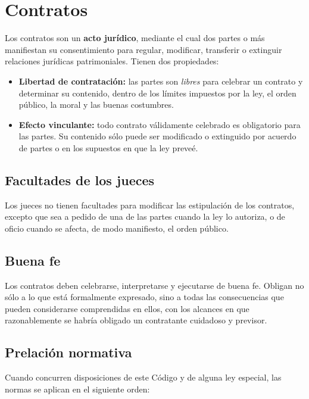 \documentclass[../resumen.tex]{subfiles}
\begin{document}
\section{Contratos}

Los contratos son un \textbf{acto jurídico}, mediante el cual dos partes o más
manifiestan su consentimiento para regular, modificar, transferir o extinguir
relaciones jurídicas patrimoniales. Tienen dos propiedades:

\begin{itemize}
  \item \textbf{Libertad de contratación:} las partes son \textit{libres} para 
    celebrar un contrato y determinar su contenido, dentro de los límites 
    impuestos por la ley, el orden público, la moral y las buenas costumbres.
  \item \textbf{Efecto vinculante:} todo contrato válidamente celebrado es 
    obligatorio para las partes. Su contenido sólo puede ser modificado o 
    extinguido por acuerdo de partes o en los supuestos en que la ley preveé.
\end{itemize}

\subsection{Facultades de los jueces}

Los jueces no tienen facultades para modificar las estipulación de los contratos,
excepto que sea a pedido de una de las partes cuando la ley lo autoriza, o de
oficio cuando se afecta, de modo manifiesto, el orden público.

\subsection{Buena fe}

Los contratos deben celebrarse, interpretarse y ejecutarse de buena fe. Obligan
no sólo a lo que está formalmente expresado, sino a todas las consecuencias que
pueden considerarse comprendidas en ellos, con los alcances en que razonablemente
se habría obligado un contratante cuidadoso y previsor.

\subsection{Prelación normativa}

Cuando concurren disposiciones de este Código y de alguna ley especial, las normas
se aplican en el siguiente orden:
\end{document}
